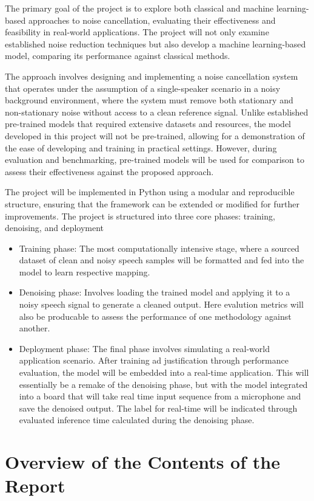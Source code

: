 The primary goal of the project is to explore both classical and machine learning-based approaches to noise cancellation, evaluating their effectiveness and feasibility in real-world applications. The project will not only examine established noise reduction techniques but also develop a machine learning-based model, comparing its performance against classical methods.

The approach involves designing and implementing a noise cancellation system that operates under the assumption of a single-speaker scenario in a noisy background environment, where the system must remove both stationary and non-stationary noise without access to a clean reference signal. Unlike established pre-trained models that required extensive datasets and resources, the model developed in this project will not be pre-trained, allowing for a demonstration of the ease of developing and training in practical settings. However, during evaluation and benchmarking, pre-trained models will be used for comparison to assess their effectiveness against the proposed approach.

The project will be implemented in Python using a modular and reproducible structure, ensuring that the framework can be extended or modified for further improvements. The project is structured into three core phases: training, denoising, and deployment
\begin{itemize}
    \item Training phase: The most computationally intensive stage, where a sourced dataset of clean and noisy speech samples will be formatted and fed into the model to learn respective mapping.
    \item Denoising phase: Involves loading the trained model and applying it to a noisy speech signal to generate a cleaned output. Here evalution metrics will also be producable to assess the performance of one methodology against another.
    \item Deployment phase: The final phase involves simulating a real-world application scenario. After training ad justification through performance evaluation, the model will be embedded into a real-time application. This will essentially be a remake of the denoising phase, but with the model integrated into a board that will take real time input sequence from a microphone and save the denoised output. The label for real-time will be indicated through evaluated inference time calculated during the denoising phase.
\end{itemize}


\section{Overview of the Contents of the Report}